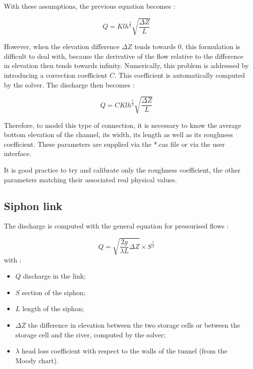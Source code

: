 With these assumptions, the previous equation becomes :

\begin{equation}
 Q = K l h^{\frac{5}{3}} \sqrt{\frac{\Delta Z}{L}}
\end{equation}

However, when the elevation difference $\Delta Z$ tends towards $0$, this formulation is difficult to deal with, because the derivative of the flow relative to the difference in elevation then tends towards infinity. Numerically, this problem is addressed by introducing a correction coefficient $C$. This coefficient is automatically computed by the solver. The discharge then becomes :

\begin{equation}
 Q = C K l h^{\frac{5}{3}} \sqrt{\frac{\Delta Z}{L}}
\end{equation}

Therefore, to model this type of connection, it is necessary to know the average bottom elevation of the channel, its width, its length as well as its roughness coefficient. These parameters are supplied via the *.cas file or via the user interface.

It is good practice to try and calibrate only the roughness coefficient, the other parameters matching their associated real physical values.

\subsection{Siphon link}

The discharge is computed with the general equation for pressurised flows :

\begin{equation}
 Q = \sqrt{\frac{2 g}{\lambda L}\Delta Z} \times S^{\frac{5}{4}}
\end{equation}
with :
\begin{itemize}
 \item $Q$ discharge in the link;
 \item $S$ section of the siphon;
 \item $L$ length of the siphon;
 \item $\Delta Z$ the difference in elevation between the two storage cells or between the storage cell and the river, computed by the solver;
 \item $\lambda$ head loss coefficient with respect to the walls of the tunnel (from the Moody chart).
\end{itemize}

